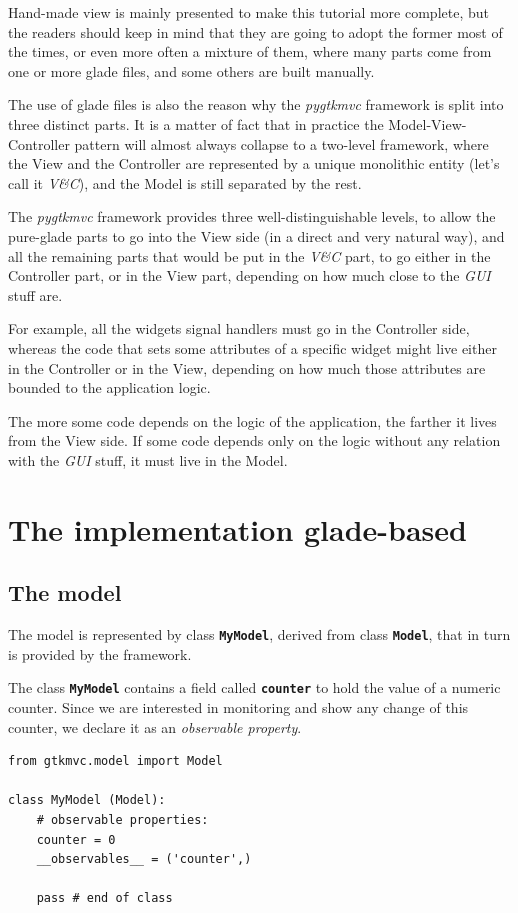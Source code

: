 \documentclass{article}
\newcommand{\kw}[1]{\emph{#1}\xspace}
\newcommand{\gui}{\kw{GUI}}
\newcommand{\pygtkmvc}{\kw{pygtkmvc}}
\newcommand{\codename}[1]{\texttt{\bfseries \textcolor {codecolor}{#1}}\xspace}
\newcommand{\codesize}{\small } %
\newcommand{\vc}{\kw{V\&C}}
\begin{document}
Hand-made view is mainly presented to make this tutorial more
complete, but the readers should keep in mind that they are going to
adopt the former most of the times, or even more often a mixture of
them, where many parts come from one or more glade files, and some
others are built manually.

The use of glade files is also the reason why the \pygtkmvc framework
is split into three distinct parts. It is a matter of fact that in
practice the Model-View-Controller pattern will almost always collapse
to a two-level framework, where the View and the Controller are
represented by a unique monolithic entity (let's call it \vc),
and the Model is still separated by the rest.

The \pygtkmvc framework provides three well-distinguishable levels, to
allow the pure-glade parts to go into the View side (in a direct and
very natural way), and all the remaining parts that would be put in
the \vc part, to go either in the Controller part, or in the View
part, depending on how much close to the \gui stuff are.

For example, all the widgets signal handlers must go in the Controller
side, whereas the code that sets some attributes of a specific widget
might live either in the Controller or in the View, depending on how
much those attributes are bounded to the application logic.

The more some code depends on the logic of the application, the
farther it lives from the View side. If some code depends only on the
logic without any relation with the \gui stuff, it must live in the
Model.


\section{The implementation glade-based}

\subsection{The model}
The model is represented by class \codename{MyModel}, derived from
class \codename{Model}, that in turn is provided by the framework.

The class \codename{MyModel} contains a field called
\codename{counter} to hold the value of a numeric counter. Since we
are interested in monitoring and show any change of this counter, we
declare it as an \emph{observable property}.


{ \codesize 
\begin{verbatim}   
from gtkmvc.model import Model

class MyModel (Model):
    # observable properties:
    counter = 0
    __observables__ = ('counter',)

    pass # end of class
\end{verbatim}
} 
\end{document}
